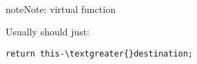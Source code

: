 \documentclass[letterpaper,10pt,english]{sphinxmanual}
\begin{document}

\begin{fulllineitems}
\label{compression:compression::output_raw}~
\begin{notice}{note}{Note:}
virtual function
\end{notice}

Usually should just:

\begin{Verbatim}[commandchars=\\\{\}]
return this-\textgreater{}destination;
\end{Verbatim}

\end{fulllineitems}

\end{document}
